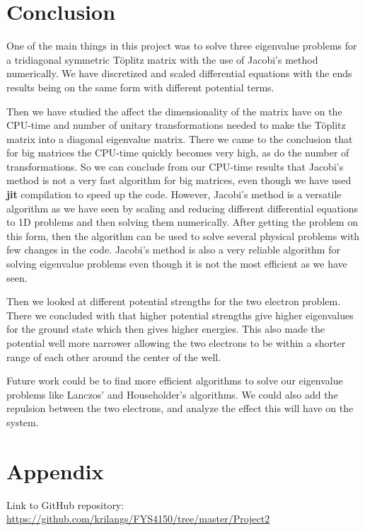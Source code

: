 \documentclass[12pt,a4paper,english]{article}
\begin{document}
\section{Conclusion}
One of the main things in this project was to solve three eigenvalue problems for a tridiagonal symmetric Töplitz matrix with the use of Jacobi's method numerically. We have discretized and scaled differential equations with the ends results being on the same form with different potential terms. 

Then we have studied the affect the dimensionality of the matrix have on the CPU-time and number of unitary transformations needed to make the Töplitz matrix into a diagonal eigenvalue matrix. There we came to the conclusion that for big matrices the CPU-time quickly becomes very high, as do the number of transformations. So we can conclude from our CPU-time results that Jacobi's method is not a very fast algorithm for big matrices, even though we have used \textbf{jit} compilation to speed up the code. However, Jacobi's method is a versatile algorithm as we have seen by scaling and reducing different differential equations to 1D problems and then solving them numerically. After getting the problem on this form, then the algorithm can be used to solve several physical problems with few changes in the code. Jacobi's method is also a very reliable algorithm for solving eigenvalue problems even though it is not the most efficient as we have seen.

Then we looked at different potential strengths for the two electron problem. There we concluded with that higher potential strengths give higher eigenvalues for the ground state which then gives higher energies. This also made the potential well more narrower allowing the two electrons to be within a shorter range of each other around the center of the well.

Future work could be to find more efficient algorithms to solve our eigenvalue problems like Lanczos' and Householder's algorithms. We could also add the repulsion between the two electrons, and analyze the effect this will have on the system.

\appendix
\section{Appendix}
\label{sect:appendix}
Link to GitHub repository:\\
\url{https://github.com/krilangs/FYS4150/tree/master/Project2}



\end{document}

